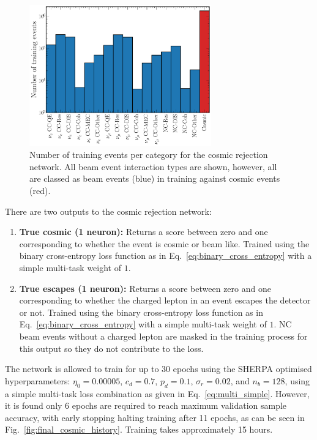 \begin{figure} %
    \includegraphics[width=0.7\textwidth]{diagrams/6-cvn/chipsnet/explore_cosmic_training_sample.pdf}
    \caption[Number of training events per category for the cosmic rejection network.]
    {Number of training events per category for the cosmic rejection network. All beam event
        interaction types are shown, however, all are classed as beam events (blue) in training
        against cosmic events (red).}
    \label{fig:cosmic_training_sample}
\end{figure}

There are two outputs to the cosmic rejection network:
\begin{enumerate}
    \item \textbf{True cosmic (1 neuron):} Returns a score between zero and one corresponding to
          whether the event is cosmic or beam like. Trained using the binary cross-entropy loss
          function as in Eq.~\ref{eq:binary_cross_entropy} with a simple multi-task weight of $1$.
    \item \textbf{True escapes (1 neuron):} Returns a score between zero and one corresponding to
          whether the charged lepton in an event escapes the detector or not. Trained using the
          binary cross-entropy loss function as in Eq.~\ref{eq:binary_cross_entropy} with a simple
          multi-task weight of $1$. NC beam events without a charged lepton are masked in the
          training process for this output so they do not contribute to the loss.
\end{enumerate}

The network is allowed to train for up to 30 epochs using the SHERPA optimised hyperparameters:
$\eta_{0}=0.00005$, $c_{d}=0.7$, $p_{d}=0.1$, $\sigma_{r}=0.02$, and $n_{b}=128$, using a simple
multi-task loss combination as given in Eq.~\ref{eq:multi_simple}. However, it is found only 6
epochs are required to reach maximum validation sample accuracy, with early stopping halting
training after 11 epochs, as can be seen in Fig.~\ref{fig:final_cosmic_history}. Training takes
approximately 15 hours.

